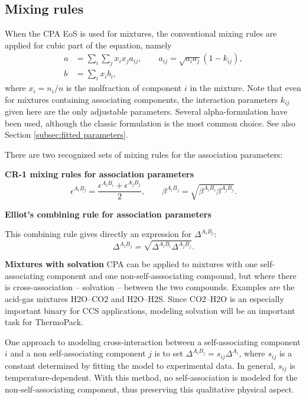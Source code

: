 \documentclass[10pt, a4paper]{article}
\begin{document}
\subsection{Mixing rules}
When the CPA EoS is used for mixtures, the conventional mixing rules are applied for cubic part of the equation, namely
\begin{align}
  a &= \sum_i \sum_j x_i x_j a_{ij}, \qquad a_{ij} = \sqrt{a_i a_j} (1-k_{ij}), \\
  b &= \sum_i x_i b_i,
\end{align}
where $x_i = n_i/n$ is the molfraction of component $i$ in the mixture. Note that even for mixtures containing associating components, the interaction parameters $k_{ij}$ given here are the only adjustable parameters. Several alpha-formulation have been used, although the classic formulation is the most common choice. See also Section \ref{subsec:fitted parameters}.

There are two recognized sets of mixing rules for the association parameters: %

\textbf{CR-1 mixing rules for association parameters}
\begin{equation}
  \epsilon^{A_i B_j} = \frac{\epsilon^{A_i B_i} + \epsilon^{A_j B_j}}{2}, \qquad \beta^{A_i B_j} = \sqrt{\beta^{A_i B_i} \beta^{A_j B_j}}.
\end{equation}

\textbf{Elliot's combining rule for association parameters}

This combining rule gives directly an expression for $\Delta^{A_i B_j}$:
\begin{equation}
  \Delta^{A_i B_j} = \sqrt{\Delta^{A_i B_i} \Delta^{A_j B_j}}.
\end{equation}

\textbf{Mixtures with solvation}
CPA can be applied to mixtures with one self-associating component and one non-self-asssociating compound, but where there is cross-association -- solvation -- between the two compounds. Examples are the acid-gas mixtures H2O--CO2 and H2O--H2S. Since CO2--H2O is an especially important binary for CCS applications, modeling solvation will be an important task for ThermoPack.

One approach to modeling cross-interaction between a self-associating component $i$ and a non self-associating component $j$ is to set $\Delta^{A_i B_j} = s_{ij} \Delta^{A_i}$, where $s_{ij}$ is a constant determined by fitting the model to experimental data. In general, $s_{ij}$ is temperature-dependent. With this method, no self-association is modeled for the non-self-associating component, thus preserving this qualitative physical aspect. %
\end{document}

